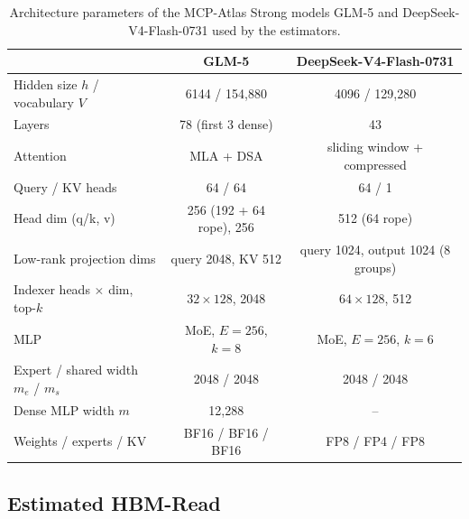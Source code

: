 \documentclass[11pt, copyright, logo, secondlogo]{template/lark}
\begin{document}
\begin{table}[h]
\caption{Architecture parameters of the MCP-Atlas Strong models GLM-5 and
DeepSeek-V4-Flash-0731 used by the estimators.}
\label{tab:arch_api}
\centering
\small
\begin{tabular}{@{}lcc@{}}
\toprule
& GLM-5 & DeepSeek-V4-Flash-0731 \\
\midrule
Hidden size $h$ / vocabulary $V$ & 6144 / 154{,}880 & 4096 / 129{,}280 \\
Layers & 78 (first 3 dense) & 43 \\
Attention & MLA + DSA & sliding window + compressed \\
Query / KV heads & 64 / 64 & 64 / 1 \\
Head dim (q/k, v) & 256 (192 + 64 rope), 256 & 512 (64 rope) \\
Low-rank projection dims & query 2048, KV 512 & query 1024, output 1024 (8 groups) \\
Indexer heads $\times$ dim, top-$k$ & $32\times128$, 2048 & $64\times128$, 512 \\
MLP & MoE, $E=256$, $k=8$ & MoE, $E=256$, $k=6$ \\
Expert / shared width $m_e$ / $m_s$ & 2048 / 2048 & 2048 / 2048 \\
Dense MLP width $m$ & 12{,}288 & -- \\
Weights / experts / KV & BF16 / BF16 / BF16 & FP8 / FP4 / FP8 \\
\bottomrule
\end{tabular}
\end{table}

\subsection{Estimated HBM-Read}
\label{sec:appendix_hbm}
\end{document}

